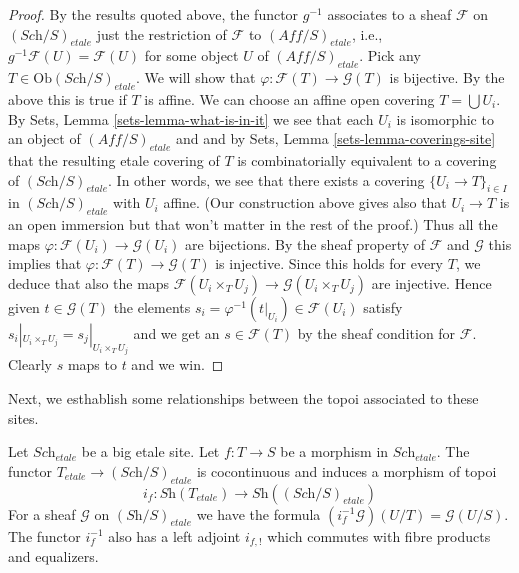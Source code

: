 \begin{proof}
\medskip\noindent
By the results quoted above,
the functor $g^{-1}$ associates to a sheaf $\mathcal{F}$ on
$(\textit{Sch}/S)_{etale}$ just the restriction of $\mathcal{F}$
to $(\textit{Aff}/S)_{etale}$, i.e., $g^{-1}\mathcal{F}(U) = \mathcal{F}(U)$
for some object $U$ of $(\textit{Aff}/S)_{etale}$. Pick any
$T \in \text{Ob}(\textit{Sch}/S)_{etale}$. We will show that
$\varphi : \mathcal{F}(T) \to \mathcal{G}(T)$ is bijective.
By the above this is true if $T$ is affine.
We can choose an affine open covering $T = \bigcup U_i$. By
Sets, Lemma \ref{sets-lemma-what-is-in-it} we see that
each $U_i$ is isomorphic to an object of $(\textit{Aff}/S)_{etale}$
and and by Sets, Lemma \ref{sets-lemma-coverings-site}
that the resulting etale covering of $T$ is combinatorially
equivalent to a covering of $(\textit{Sch}/S)_{etale}$.
In other words, we see that there exists a covering
$\{U_i \to T\}_{i \in I}$ in $(\textit{Sch}/S)_{etale}$ with $U_i$ affine.
(Our construction above gives also that $U_i \to T$ is an open immersion
but that won't matter in the rest of the proof.)
Thus all the maps $\varphi : \mathcal{F}(U_i) \to \mathcal{G}(U_i)$
are bijections. By the sheaf property of $\mathcal{F}$ and $\mathcal{G}$
this implies that $\varphi : \mathcal{F}(T) \to \mathcal{G}(T)$ is injective.
Since this holds for every $T$, we deduce that also the maps
$\mathcal{F}(U_i \times_T U_j) \to \mathcal{G}(U_i \times_T U_j)$
are injective. Hence given $t \in \mathcal{G}(T)$
the elements $s_i = \varphi^{-1}(t|_{U_i}) \in \mathcal{F}(U_i)$
satisfy $s_i|_{U_i \times_T U_j} = s_j|_{U_i \times_T U_j}$
and we get an $s \in \mathcal{F}(T)$ by the sheaf condition
for $\mathcal{F}$. Clearly $s$ maps to $t$ and we win.
\end{proof}

\noindent
Next, we esthablish some relationships between the topoi
associated to these sites.

\begin{lemma}
\label{lemma-put-in-T-etale}
Let $\textit{Sch}_{etale}$ be a big etale site.
Let $f : T \to S$ be a morphism in $\textit{Sch}_{etale}$.
The functor $T_{etale} \to (\textit{Sch}/S)_{etale}$
is cocontinuous and induces a morphism of topoi
$$
i_f :
\textit{Sh}(T_{etale})
\longrightarrow
\textit{Sh}((\textit{Sch}/S)_{etale})
$$
For a sheaf $\mathcal{G}$ on $(\textit{Sh}/S)_{etale}$
we have the formula $(i_f^{-1}\mathcal{G})(U/T) = \mathcal{G}(U/S)$.
The functor $i_f^{-1}$ also has a left adjoint $i_{f, !}$ which commutes
with fibre products and equalizers.
\end{lemma}

